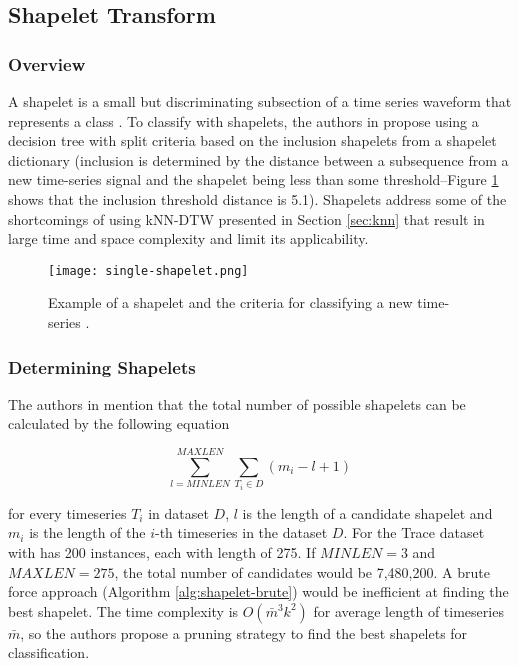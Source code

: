 \subsection{Shapelet Transform}

\subsubsection{Overview}
A shapelet is a small but discriminating subsection of a time series waveform that represents a class \cite{yeTimeSeriesShapelets2009}. To classify with shapelets, the authors in \cite{yeTimeSeriesShapelets2009} propose using a decision tree with split criteria based on the inclusion shapelets from a shapelet dictionary (inclusion is determined by the distance between a subsequence from a new time-series signal and the shapelet being less than some threshold--Figure \ref{fig:single-shapelet} shows that the inclusion threshold distance is 5.1). Shapelets address some of the shortcomings of using kNN-DTW presented in Section \ref{sec:knn} that result in large time and space complexity and limit its applicability. 

\begin{figure}[ht]
    \centering
    \texttt{[image: single-shapelet.png]}
    \caption{Example of a shapelet and the criteria for classifying a new time-series \cite{yeTimeSeriesShapelets2009}.}
    \label{fig:single-shapelet}
\end{figure}


\subsubsection{Determining Shapelets}
The authors in \cite{yeTimeSeriesShapelets2009} mention that the total number of possible shapelets can be calculated by the following equation

\begin{equation}
    \sum_{l=MINLEN}^{MAXLEN} \sum_{T_i \in D} (m_i - l + 1)
\end{equation}

for every timeseries $T_i$ in dataset $D$, $l$ is the length of a candidate shapelet and $m_i$ is the length of the $i$-th timeseries in the dataset $D$. For the Trace dataset with has 200 instances, each with length of 275. If $MINLEN=3$ and $MAXLEN=275$, the total number of candidates would be 7,480,200. A brute force approach (Algorithm \ref{alg:shapelet-brute}) would be inefficient at finding the best shapelet. The time complexity is $O(\bar{m}^3k^2)$ for average length of timeseries $\bar{m}$, so the authors propose a pruning strategy to find the best shapelets for classification.


